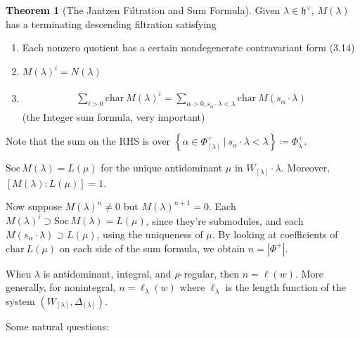 \documentclass[11pt]{scrartcl}
\theoremstyle{definition}
\theoremstyle{theorem}
\newtheorem{theorem}{Theorem}[section]
\theoremstyle{proof}
\theoremstyle{definition}
\theoremstyle{break}
\theoremstyle{problem}
\providecommand{\tightlist}{%
  \setlength{\itemsep}{0pt}\setlength{\parskip}{0pt}}
\newcommand{\ch}[0]{\mathrm{char}~}
\newcommand{\abs}[1]{{\left\lvert {#1} \right\rvert}}
\newcommand{\dash}[0]{{\hbox{-}}}
\newcommand{\definedas}[0]{\coloneqq}
\newcommand{\dual}[0]{^\vee}
\newcommand{\lieh}[0]{{\mathfrak{h}}}
\newcommand{\soc}[0]{\mathrm{Soc}\,}
\newcommand{\suchthat}[0]{{~\mathrel{\Big|}~}}
\newcommand{\theset}[1]{\left\{{#1}\right\}}
\begin{document}
\begin{theorem}[The Jantzen Filtration and Sum Formula]

Given \(\lambda \in \lieh\dual\), \(M(\lambda)\) has a terminating
descending filtration satisfying

\begin{enumerate}
\def\labelenumi{\alph{enumi}.}
\item
  Each nonzero quotient has a certain nondegenerate contravariant form
  (3.14)
\item
  \(M(\lambda)^i = N(\lambda)\)
\item

  \begin{align*}\sum_{i > 0} \ch M(\lambda)^i = \sum_{\alpha > 0, s_\alpha \cdot \lambda < \lambda} \ch M(s_\alpha \cdot \lambda)\end{align*}
  (the Integer sum formula, very important)
\end{enumerate}

\end{theorem}

Note that the sum on the RHS is over
\(\theset{ \alpha\in\Phi^+_{[\lambda]} \suchthat s_\alpha \cdot \lambda < \lambda } \definedas \Phi^+_\lambda\).

\begin{description}
\tightlist
\item[Fact]
\(\soc M(\lambda) = L(\mu)\) for the unique antidominant \(\mu\) in
\(W_{[\lambda]}\cdot \lambda\). Moreover, \([M(\lambda) : L(\mu)] = 1\).
\end{description}

Now suppose \(M(\lambda)^n \neq 0\) but \(M(\lambda)^{n+1} = 0\). Each
\(M(\lambda)^i \supset \soc M(\lambda) = L(\mu)\), since they're
submodules, and each \(M(s_\alpha \cdot \lambda) \supset L(\mu)\), using
the uniqueness of \(\mu\). By looking at coefficients of \(\ch L(\mu)\)
on each side of the sum formula, we obtain \(n = \abs{\Phi^+}\).

\begin{description}
\tightlist
\item[Exercise (5.3)]
When \(\lambda\) is antidominant, integral, and \(\rho\dash\)regular,
then \(n = \ell(w)\). More generally, for nonintegral,
\(n = \ell_\lambda(w)\) where \(\ell_\lambda\) is the length function of
the system \((W_{[\lambda]}, \Delta_{[\lambda]})\).
\end{description}

Some natural questions:
\end{document}
